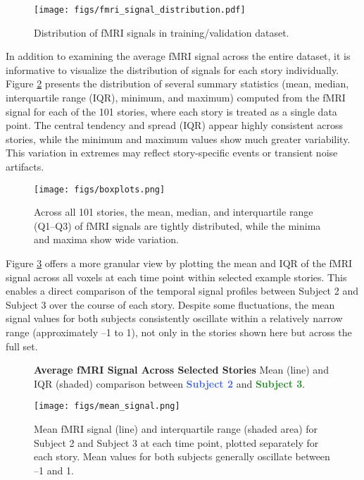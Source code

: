 \documentclass[10pt,letterpaper]{article}
\begin{document}
\begin{figure}[ht]
    \centering
    \texttt{[image: figs/fmri\_signal\_distribution.pdf]}
    \caption{Distribution of fMRI signals in training/validation dataset.}
    \label{fig:fmri_signal}
\end{figure}

In addition to examining the average fMRI signal across the entire dataset, it is informative to visualize the distribution of signals for each story individually. Figure \ref{fig:boxplots} presents the distribution of several summary statistics (mean, median, interquartile range (IQR), minimum, and maximum) computed from the fMRI signal for each of the 101 stories, where each story is treated as a single data point. The central tendency and spread (IQR) appear highly consistent across stories, while the minimum and maximum values show much greater variability. This variation in extremes may reflect story-specific events or transient noise artifacts.

\begin{figure}[ht]
    \centering
    \texttt{[image: figs/boxplots.png]}
    \caption{Across all 101 stories, the mean, median, and interquartile range (Q1–Q3) of fMRI signals are tightly distributed, while the minima and maxima show wide variation.}
    \label{fig:boxplots}
\end{figure}

Figure \ref{fig:mean_signal} offers a more granular view by plotting the mean and IQR of the fMRI signal across all voxels at each time point within selected example stories. This enables a direct comparison of the temporal signal profiles between Subject 2 and Subject 3 over the course of each story. Despite some fluctuations, the mean signal values for both subjects consistently oscillate within a relatively narrow range (approximately –1 to 1), not only in the stories shown here but across the full set.

\begin{figure}[ht]
    \centering
    \parbox{\textwidth}{\centering 
        \fontsize{13pt}{13pt}\selectfont \textbf{Average fMRI Signal Across Selected Stories}  
        {\fontsize{11pt}{13pt}\selectfont Mean (line) and IQR (shaded) comparison between   \textcolor{RoyalBlue}{\textbf{Subject 2}} and \textcolor{ForestGreen}{\textbf{Subject 3}}.} 
    }
    \texttt{[image: figs/mean\_signal.png]}
    \caption{Mean fMRI signal (line) and interquartile range (shaded area) for Subject 2 and Subject 3 at each time point, plotted separately for each story. Mean values for both subjects generally oscillate between –1 and 1.}
    \label{fig:mean_signal}
\end{figure}
\end{document}
